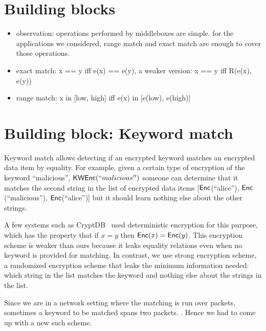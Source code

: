 
\section{Building blocks}\label{sec:blocks}


\begin{itemize}
\item observation: operations performed by middleboxes are simple. for the applications we considered, range match and exact match are enough to cover those operations.
\item exact match: x == y iff e(x) == e(y), a weaker version: x == y iff R(e(x), e(y))
\item range match: x in [low, high] iff e(x) in [e(low), e(high)]

\end{itemize}


\section{Building block: Keyword match}


%

Keyword match allows detecting if an encrypted keyword matches an encrypted data item by equality.
For example, given a certain type of encryption of the keyword ``malicious'', $\mathsf{KWEnc}(``malicious'')$ someone can determine that it matches the second string in the list of encrypted data items [$\mathsf{Enc}$(``alice''), $\mathsf{Enc}$(``malicious''), $\mathsf{Enc}$(``alice'')] but it should learn nothing else about the other strings.

A few systems such as CryptDB~\cite{cryptdb, some other} used deterministic encryption for this purpose, which has the property that if $x = y$ then $\mathsf{Enc}(x) = \mathsf{Enc}(y)$. This encryption scheme is weaker than ours because it leaks equality relations even when no keyword is provided for matching. In contrast, we use strong encryption scheme, a randomized encryption scheme that leaks the minimum information needed: which string in the list matches the keyword and nothing else about the strings in the list. 

Since we are in a network setting where the matching is run over packets, sometimes a keyword to be matched spans two packets. . Hence we had to come up with a new such scheme. 

